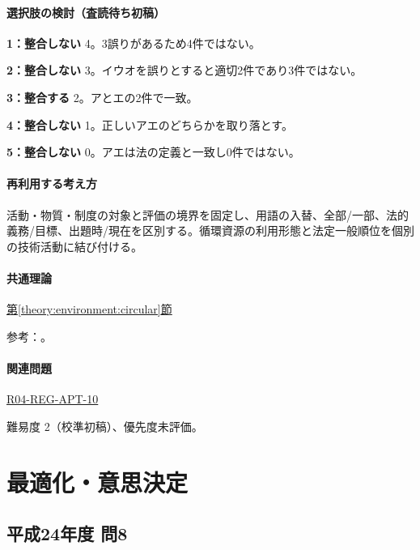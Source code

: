 \paragraph{選択肢の検討（査読待ち初稿）}\mbox{}\par

\noindent\textbf{1：整合しない} 4。3誤りがあるため4件ではない。\par

\noindent\textbf{2：整合しない} 3。イウオを誤りとすると適切2件であり3件ではない。\par

\noindent\textbf{3：整合する} 2。アとエの2件で一致。\par

\noindent\textbf{4：整合しない} 1。正しいアエのどちらかを取り落とす。\par

\noindent\textbf{5：整合しない} 0。アエは法の定義と一致し0件ではない。\par

\paragraph{再利用する考え方} 活動・物質・制度の対象と評価の境界を固定し、用語の入替、全部/一部、法的義務/目標、出題時/現在を区別する。循環資源の利用形態と法定一般順位を個別の技術活動に結び付ける。

\paragraph{共通理論} \hyperref[theory:environment:circular]{第\ref*{theory:environment:circular}節}

\par 参考：\cite{env_circular_law}。

\paragraph{関連問題} \hyperref[q:r04-reg-apt-10]{R04-REG-APT-10}

\par 難易度 2（校準初稿）、優先度未評価。

\section{最適化・意思決定}

\subsection{平成24年度 問8}
\label{q:h24-reg-apt-08}

